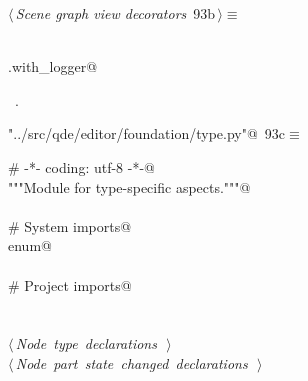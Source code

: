 \documentclass[
    a4paper,      %
    10pt,         %
    openright,    %
    notitlepage,  %
    parskip=half, %
]{scrreprt}       %
\theoremstyle{definition}                    %
\begin{document}
\begin{flushleft} \small
\begin{minipage}{\linewidth}\label{scrap149}\raggedright\small
{} $\langle\,${\itshape Scene graph view decorators}\nobreak\ {\footnotesize {93b}}$\,\rangle\equiv$
\vspace{-1exm}
\begin{list}{}{} \item
\mbox{}\lstinline@@\\
\mbox{}\lstinline@common.with_logger@\\
\mbox{}\lstinline@@{\NWsep}
\end{list}
\vspace{-1.5ex}
\footnotesize
\begin{list}{}{\setlength{\itemsep}{-\parsep}\setlength{\itemindent}{-\leftmargin}}
\item \NWtxtMacroRefIn\ .

\item{}
\end{list}
\end{minipage}\vspace{4ex}
\end{flushleft}
\begin{flushleft} \small
\begin{minipage}{\linewidth}\label{scrap150}\raggedright\small
{} \verb@"../src/qde/editor/foundation/type.py"@\nobreak\ {\footnotesize {93c}}$\equiv$
\vspace{-1ex}
\begin{list}{}{} \item
\mbox{}\lstinline@# -*- coding: utf-8 -*-@\\
\mbox{}\lstinline@"""Module for type-specific aspects."""@\\
\mbox{}\lstinline@@\\
\mbox{}\lstinline@# System imports@\\
\mbox{}\lstinline@import enum@\\
\mbox{}\lstinline@@\\
\mbox{}\lstinline@# Project imports@\\
\mbox{}\lstinline@@\\
\mbox{}\lstinline@@\\
\mbox{}\lstinline@@\hbox{$\langle\,${\itshape Node type declarations}\nobreak\ {\footnotesize {}}$\,\rangle$}\lstinline@@\\
\mbox{}\lstinline@@\hbox{$\langle\,${\itshape Node part state changed declarations}\nobreak\ {\footnotesize {}}$\,\rangle$}\lstinline@@\\
\mbox{}\lstinline@@{\NWsep}
\end{list}
\vspace{-1.5ex}
\footnotesize
\begin{list}{}{\setlength{\itemsep}{-\parsep}\setlength{\itemindent}{-\leftmargin}}

\item{}
\end{list}
\end{minipage}\vspace{4ex}
\end{flushleft}
\end{document}
